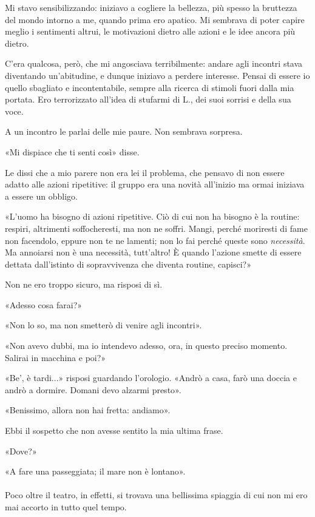 \documentclass[a4paper,12pt]{book}
\begin{document}
Mi stavo sensibilizzando: iniziavo a cogliere la bellezza, più spesso la
bruttezza del mondo intorno a me, quando prima ero apatico. Mi sembrava di
poter capire meglio i sentimenti altrui, le motivazioni dietro alle azioni e le
idee ancora più dietro.

C'era qualcosa, però, che mi angosciava terribilmente: andare agli incontri
stava diventando un'abitudine, e dunque iniziavo a perdere interesse. Pensai di
essere io quello sbagliato e incontentabile, sempre alla ricerca di stimoli
fuori dalla mia portata. Ero terrorizzato all'idea di stufarmi di L., dei suoi
sorrisi e della sua voce.

A un incontro le parlai delle mie paure. Non sembrava sorpresa.

«Mi dispiace che ti senti così» disse.

Le dissi che a mio parere non era lei il problema, che pensavo di non essere
adatto alle azioni ripetitive: il gruppo era una novità all'inizio ma ormai
iniziava a essere un obbligo.

«L'uomo ha bisogno di azioni ripetitive. Ciò di cui non ha bisogno è la
routine: respiri, altrimenti soffocheresti, ma non ne soffri. Mangi, perché
moriresti di fame non facendolo, eppure non te ne lamenti; non lo fai perché
queste sono \emph{necessità}. Ma annoiarsi non è una necessità, tutt'altro! È
quando l'azione smette di essere dettata dall'istinto di sopravvivenza che
diventa routine, capisci?»

Non ne ero troppo sicuro, ma risposi di sì.

«Adesso cosa farai?»

«Non lo so, ma non smetterò di venire agli incontri».

«Non avevo dubbi, ma io intendevo adesso, ora, in questo preciso momento.
Salirai in macchina e poi?»

«Be', è tardi...»  risposi guardando l'orologio. «Andrò a casa, farò una doccia
e andrò a dormire. Domani devo alzarmi presto».

«Benissimo, allora non hai fretta: andiamo».

Ebbi il sospetto che non avesse sentito la mia ultima frase.

«Dove?»

«A fare una passeggiata; il mare non è lontano».

\paragraph{}
Poco oltre il teatro, in effetti, si trovava una bellissima spiaggia di cui non
mi ero mai accorto in tutto quel tempo.
\end{document}
